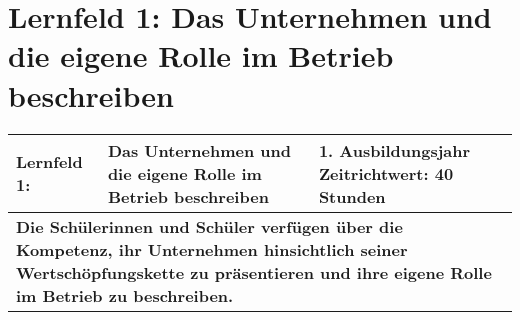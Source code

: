 \chapter{Lernfeld 1: Das Unternehmen und die eigene Rolle im Betrieb beschreiben}

\begin{table}
    [H]
    \centering
    \begin{tabular}{|p{}p{}p{}|}
        \hline
        \textbf{Lernfeld 1:} & \textbf{Das Unternehmen und die eigene Rolle im Betrieb beschreiben} & \textbf{1. Ausbildungsjahr Zeitrichtwert: 40 Stunden} \\\hline
        \multicolumn{3}{|p{\textwidth}|}{\textbf{Die Schülerinnen und Schüler verfügen über die Kompetenz, ihr Unternehmen hinsichtlich seiner Wertschöpfungskette zu präsentieren und ihre eigene Rolle im Betrieb zu beschreiben.}}
    \end{tabular}
\end{table}

% 

% 



% 

% 



% 

% 
